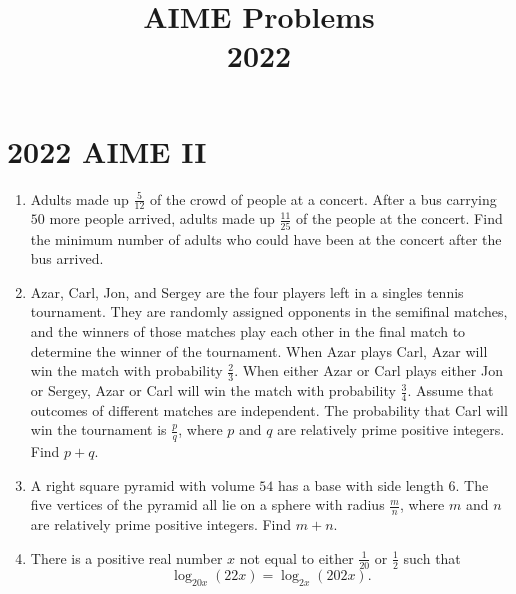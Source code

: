 \documentclass{article}
\title{AIME Problems \\ 2022}
\date{}
\begin{document}
\maketitle\thispagestyle{fancy}\newpage\section*{2022 AIME II}
\begin{enumerate}[label=\arabic*., itemsep=0.5em]
\item Adults made up \(\frac5{12}\) of the crowd of people at a concert. After a bus carrying \(50\) more people arrived, adults made up \(\frac{11}{25}\) of the people at the concert. Find the minimum number of adults who could have been at the concert after the bus arrived.\par \vspace{0.5em}\item Azar, Carl, Jon, and Sergey are the four players left in a singles tennis tournament. They are randomly assigned opponents in the semifinal matches, and the winners of those matches play each other in the final match to determine the winner of the tournament. When Azar plays Carl, Azar will win the match with probability \(\frac23\). When either Azar or Carl plays either Jon or Sergey, Azar or Carl will win the match with probability \(\frac34\). Assume that outcomes of different matches are independent. The probability that Carl will win the tournament is \(\frac{p}{q}\), where \(p\) and \(q\) are relatively prime positive integers. Find \(p+q\).\par \vspace{0.5em}\item A right square pyramid with volume \(54\) has a base with side length \(6.\) The five vertices of the pyramid all lie on a sphere with radius \(\frac mn\), where \(m\) and \(n\) are relatively prime positive integers. Find \(m+n\).\par \vspace{0.5em}\item There is a positive real number \(x\) not equal to either \(\tfrac{1}{20}\) or \(\tfrac{1}{2}\) such that
\begin{equation*}
\log_{20x} (22x)=\log_{2x} (202x).
\end{equation*}

\end{enumerate}
\end{document}
